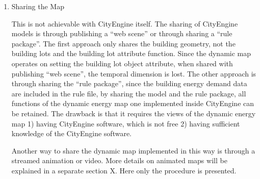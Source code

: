 \begin{enumerate}[1)]
\item{Sharing the Map}

  This is not achievable with CityEngine itself. The sharing of
  CityEngine models is through publishing a ``web scene'' or through
  sharing a ``rule package''. The first approach only shares the
  building geometry, not the building lots and the building lot
  attribute function. Since the dynamic map operates on setting the
  building lot object attribute, when shared with publishing ``web
  scene'', the temporal dimension is lost. The other approach is
  through sharing the ``rule package'', since the building energy
  demand data are included in the rule file, by sharing the model and
  the rule package, all functions of the dynamic energy map one
  implemented inside CityEngine can be retained. The drawback is that
  it requires the views of the dynamic energy map 1) having CityEngine
  software, which is not free 2) having sufficient knowledge of the
  CityEngine software.

  Another way to share the dynamic map implemented in this way is
  through a streamed animation or video. More details on animated maps
  will be explained in a separate section X. Here only the procedure
  is presented.
\end{enumerate}